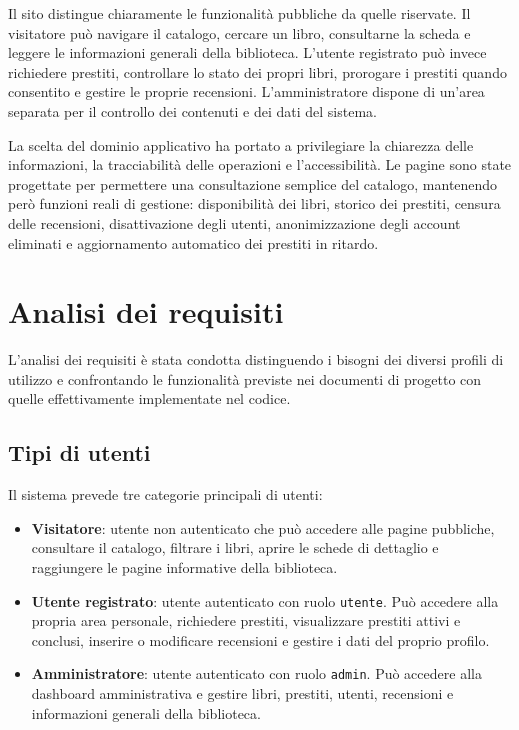 ﻿\documentclass{article}
\begin{document}
Il sito distingue chiaramente le funzionalità pubbliche da quelle riservate. Il visitatore può navigare il catalogo, cercare un libro, consultarne la scheda e leggere le informazioni generali della biblioteca. L'utente registrato può invece richiedere prestiti, controllare lo stato dei propri libri, prorogare i prestiti quando consentito e gestire le proprie recensioni. L'amministratore dispone di un'area separata per il controllo dei contenuti e dei dati del sistema.

La scelta del dominio applicativo ha portato a privilegiare la chiarezza delle informazioni, la tracciabilità delle operazioni e l'accessibilità. Le pagine sono state progettate per permettere una consultazione semplice del catalogo, mantenendo però funzioni reali di gestione: disponibilità dei libri, storico dei prestiti, censura delle recensioni, disattivazione degli utenti, anonimizzazione degli account eliminati e aggiornamento automatico dei prestiti in ritardo.

\newpage

\section{Analisi dei requisiti}
L'analisi dei requisiti è stata condotta distinguendo i bisogni dei diversi profili di utilizzo e confrontando le funzionalità previste nei documenti di progetto con quelle effettivamente implementate nel codice.

\subsection{Tipi di utenti}
Il sistema prevede tre categorie principali di utenti:

\begin{itemize}
    \item \textbf{Visitatore}: utente non autenticato che può accedere alle pagine pubbliche, consultare il catalogo, filtrare i libri, aprire le schede di dettaglio e raggiungere le pagine informative della biblioteca.
    \item \textbf{Utente registrato}: utente autenticato con ruolo \texttt{utente}. Può accedere alla propria area personale, richiedere prestiti, visualizzare prestiti attivi e conclusi, inserire o modificare recensioni e gestire i dati del proprio profilo.
    \item \textbf{Amministratore}: utente autenticato con ruolo \texttt{admin}. Può accedere alla dashboard amministrativa e gestire libri, prestiti, utenti, recensioni e informazioni generali della biblioteca.
\end{itemize}
\end{document}
